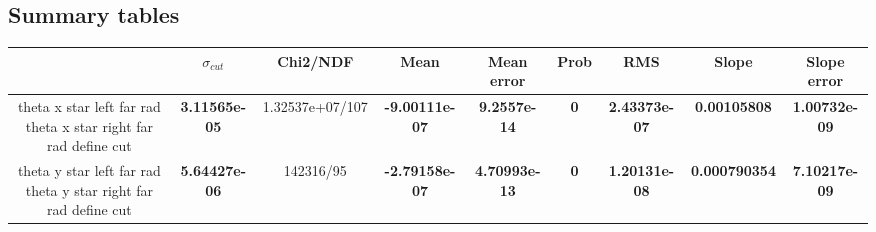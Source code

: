 \documentclass{article}
\begin{document}
\begin{landscape}
\section{Summary tables}
{\scriptsize\begin{tabular}{ | c  | c  | c  | c  | c  | c  | c  | c  | c  | } \hline 
	 & $\sigma_{cut}$ & Chi2/NDF & Mean & Mean error & Prob & RMS & Slope & Slope error \\ \hline
	theta x star left far rad theta x star right far rad define cut &  { \bf\color{red} 3.11565e-05 }  & 1.32537e+07/107 &  { \bf\color{red} -9.00111e-07 }  &  { \bf\color{red} 9.2557e-14 }  &  { \bf\color{red} 0 }  &  { \bf\color{red} 2.43373e-07 }  &  { \bf\color{red} 0.00105808 }  &  { \bf\color{red} 1.00732e-09 }  \\ \hline
	theta y star left far rad theta y star right far rad define cut &  { \bf\color{red} 5.64427e-06 }  & 142316/95 &  { \bf\color{red} -2.79158e-07 }  &  { \bf\color{red} 4.70993e-13 }  &  { \bf\color{red} 0 }  &  { \bf\color{red} 1.20131e-08 }  &  { \bf\color{red} 0.000790354 }  &  { \bf\color{red} 7.10217e-09 }  \\ \hline
\end{tabular}}
\end{landscape}
\end{document}
